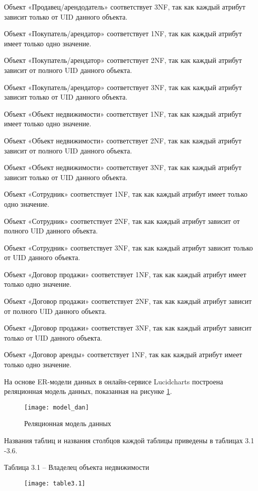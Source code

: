 Объект «Продавец/арендодатель» соответствует 3NF, так как каждый атрибут зависит только от UID данного объекта.

Объект «Покупатель/арендатор» соответствует 1NF, так как каждый атрибут имеет только одно значение.

Объект «Покупатель/арендатор» соответствует 2NF, так как каждый атрибут зависит от полного UID данного объекта.

Объект «Покупатель/арендатор» соответствует 3NF, так как каждый атрибут зависит только от UID данного объекта.

Объект «Объект недвижимости» соответствует 1NF, так как каждый атрибут имеет только одно значение.

Объект «Объект недвижимости» соответствует 2NF, так как каждый атрибут зависит от полного UID данного объекта.

Объект «Объект недвижимости» соответствует 3NF, так как каждый атрибут зависит только от UID данного объекта.

Объект «Сотрудник» соответствует 1NF, так как каждый атрибут имеет только одно значение.

Объект «Сотрудник» соответствует 2NF, так как каждый атрибут зависит от полного UID данного объекта.

Объект «Сотрудник» соответствует 3NF, так как каждый атрибут зависит только от UID данного объекта.

Объект «Договор продажи» соответствует 1NF, так как каждый атрибут имеет только одно значение.

Объект «Договор продажи» соответствует 2NF, так как каждый атрибут зависит от полного UID данного объекта.

Объект «Договор продажи» соответствует 3NF, так как каждый атрибут зависит только от UID данного объекта.

Объект «Договор аренды» соответствует 1NF, так как каждый атрибут имеет только одно значение.


На основе ER-модели данных в онлайн-сервисе Lucidcharts построена реляционная модель данных, показанная на рисунке \ref{exchange_scheme:image}.

\begin{figure}[H]
\texttt{[image: model\_dan]}
\caption{Реляционная модель данных}
\label{exchange_scheme:image}
\end{figure}

Названия таблиц и названия столбцов каждой таблицы приведены в таблицах 3.1 -3.6.

Таблица 3.1 – Владелец объекта недвижимости
\begin{figure}[H]
	\texttt{[image: table3.1]}
	\label{tabl3.1:image}
\end{figure}

